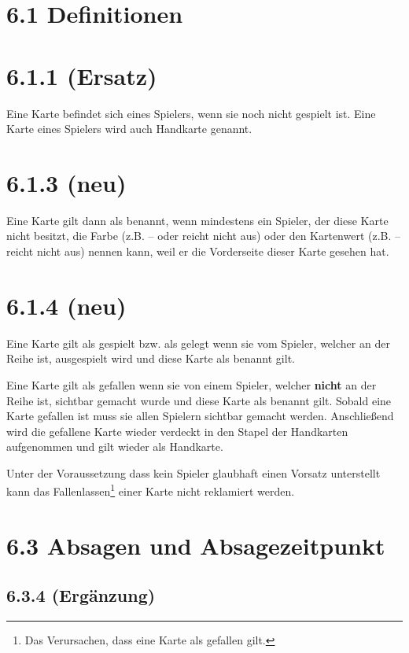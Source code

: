 \section*{6.1 Definitionen}

\section*{6.1.1 (Ersatz)}

Eine Karte befindet sich  eines Spielers, wenn sie noch nicht
gespielt ist. Eine Karte  eines Spielers wird auch Handkarte
genannt.

\section*{6.1.3 (neu)}

Eine Karte gilt dann als benannt, wenn mindestens ein Spieler, der diese Karte
nicht besitzt, die Farbe (z.B.  --  oder 
reicht nicht aus) oder den Kartenwert (z.B.  --  reicht
nicht aus) nennen kann, weil er die Vorderseite dieser Karte gesehen hat.

\section*{6.1.4 (neu)}

Eine Karte gilt als gespielt bzw. als gelegt wenn sie vom Spieler, welcher an
der Reihe ist, ausgespielt wird und diese Karte als benannt gilt.

Eine Karte gilt als gefallen wenn sie von einem Spieler, welcher \textbf{nicht}
an der Reihe ist, sichtbar gemacht wurde und diese Karte als benannt gilt.
Sobald eine Karte gefallen ist muss sie allen Spielern sichtbar gemacht werden.
Anschließend wird die gefallene Karte wieder verdeckt in den Stapel der
Handkarten aufgenommen und gilt wieder als Handkarte.

Unter der Voraussetzung dass kein Spieler glaubhaft einen Vorsatz unterstellt
kann das Fallenlassen\footnote{Das Verursachen, dass eine Karte als gefallen
gilt.} einer Karte nicht reklamiert werden.

\section*{6.3 Absagen und Absagezeitpunkt}

\subsection*{6.3.4 (Ergänzung)}


